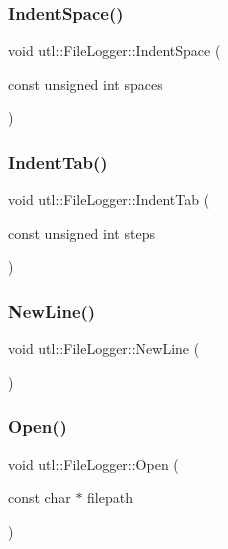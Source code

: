 \subsubsection{\texorpdfstring{Indent\+Space()}{IndentSpace()}}
{\footnotesize\ttfamily void utl\+::\+File\+Logger\+::\+Indent\+Space (\begin{DoxyParamCaption}\item[{const unsigned int}]{spaces }\end{DoxyParamCaption})}

\mbox{\label{classutl_1_1_file_logger_a286c8ae460735757b7948cf99d418ed5}} 
\subsubsection{\texorpdfstring{Indent\+Tab()}{IndentTab()}}
{\footnotesize\ttfamily void utl\+::\+File\+Logger\+::\+Indent\+Tab (\begin{DoxyParamCaption}\item[{const unsigned int}]{steps }\end{DoxyParamCaption})}

\mbox{\label{classutl_1_1_file_logger_ae4a25d385148ae2ebb310e779a23c4aa}} 
\subsubsection{\texorpdfstring{New\+Line()}{NewLine()}}
{\footnotesize\ttfamily void utl\+::\+File\+Logger\+::\+New\+Line (\begin{DoxyParamCaption}{ }\end{DoxyParamCaption})}

\mbox{\label{classutl_1_1_file_logger_affe578f56cb67c168db89edf6b93497f}} 
\subsubsection{\texorpdfstring{Open()}{Open()}}
{\footnotesize\ttfamily void utl\+::\+File\+Logger\+::\+Open (\begin{DoxyParamCaption}\item[{const char $\ast$}]{filepath }\end{DoxyParamCaption})}

